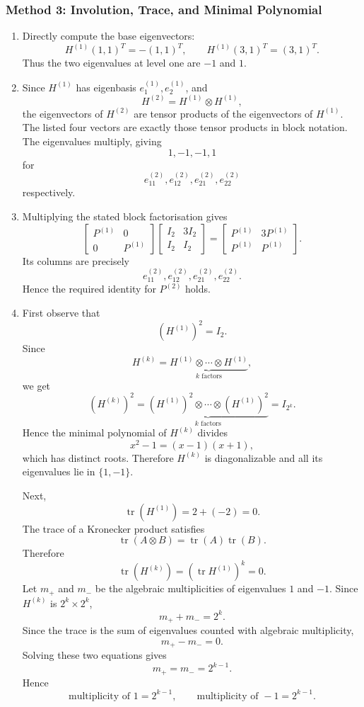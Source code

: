 \documentclass[12pt]{article}
\newcommand{\tr}{\operatorname{tr}}
\begin{document}
\subsubsection{Method 3: Involution, Trace, and Minimal Polynomial}
\begin{enumerate}[label=(\alph*)]
  \item Directly compute the base eigenvectors:
  \[
  H^{(1)}(1,1)^T=-(1,1)^T,
  \qquad
  H^{(1)}(3,1)^T=(3,1)^T.
  \]
  Thus the two eigenvalues at level one are $-1$ and $1$.

  \item Since $H^{(1)}$ has eigenbasis $e_1^{(1)},e_2^{(1)}$, and
  \[
  H^{(2)}=H^{(1)}\otimes H^{(1)},
  \]
  the eigenvectors of $H^{(2)}$ are tensor products of the eigenvectors of $H^{(1)}$. The listed four vectors are exactly those tensor products in block notation. The eigenvalues multiply, giving
  \[
  \boxed{1,-1,-1,1}
  \]
  for
  \[
  e_{11}^{(2)},e_{12}^{(2)},e_{21}^{(2)},e_{22}^{(2)}
  \]
  respectively.

  \item Multiplying the stated block factorisation gives
  \[
  \begin{bmatrix}P^{(1)}&0\\0&P^{(1)}\end{bmatrix}
  \begin{bmatrix}I_2&3I_2\\I_2&I_2\end{bmatrix}
  =\begin{bmatrix}P^{(1)}&3P^{(1)}\\P^{(1)}&P^{(1)}\end{bmatrix}.
  \]
  Its columns are precisely
  \[
  e_{11}^{(2)},e_{12}^{(2)},e_{21}^{(2)},e_{22}^{(2)}.
  \]
  Hence the required identity for $P^{(2)}$ holds.

  \item First observe that
  \[
  (H^{(1)})^2=I_2.
  \]
  Since
  \[
  H^{(k)}=\underbrace{H^{(1)}\otimes\cdots\otimes H^{(1)}}_{k\text{ factors}},
  \]
  we get
  \[
  (H^{(k)})^2
  =\underbrace{(H^{(1)})^2\otimes\cdots\otimes (H^{(1)})^2}_{k\text{ factors}}
  =I_{2^k}.
  \]
  Hence the minimal polynomial of $H^{(k)}$ divides
  \[
  x^2-1=(x-1)(x+1),
  \]
  which has distinct roots. Therefore $H^{(k)}$ is diagonalizable and all its eigenvalues lie in $\{1,-1\}$.

  Next,
  \[
  \tr(H^{(1)})=2+(-2)=0.
  \]
  The trace of a Kronecker product satisfies
  \[
  \tr(A\otimes B)=\tr(A)\tr(B).
  \]
  Therefore
  \[
  \tr(H^{(k)})=(\tr H^{(1)})^k=0.
  \]
  Let $m_+$ and $m_-$ be the algebraic multiplicities of eigenvalues $1$ and $-1$. Since $H^{(k)}$ is $2^k\times2^k$,
  \[
  m_++m_-=2^k.
  \]
  Since the trace is the sum of eigenvalues counted with algebraic multiplicity,
  \[
  m_+-m_-=0.
  \]
  Solving these two equations gives
  \[
  m_+=m_-=2^{k-1}.
  \]
  Hence
  \[
  \boxed{\text{multiplicity of }1=2^{k-1},
  \qquad
  \text{multiplicity of }-1=2^{k-1}.}
  \]
\end{enumerate}
\end{document}
